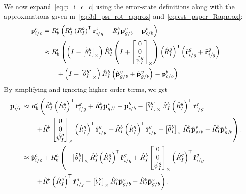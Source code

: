 We now expand~\eqref{eq:p_i_c_c} using the error-state definitions along with
the approximations given in~\eqref{eq:3d_psi_rot_approx}
and~\eqref{eq:est_paper_Rapprox}:
\begin{align}
  \mathrm{\mathbf{p}}_{i/c}^c &= R_b^c \left( R_I^b \left( R_I^g \right)^{\mathsf{T}}
  \mathrm{\mathbf{r}}_{i/g}^g + R_I^b \mathrm{\mathbf{p}}_{g/b}^v - \mathrm{\mathbf{p}}_{c/b}^b \right) \\
  &\approx R_b^c \left( \left( I - \left[ \tilde{\mathrm{\mathbf{\theta}}}_I^b
     \right]_{\times} \right) \hat{R}_I^b \left( I +
    \left[  \begin{matrix} 0 \\ 0 \\ \tilde{\psi}_I^g \end{matrix}  \right]_{\times}
  \right) \left( \hat{R}_I^g \right)^{\mathsf{T}}
  \left( \hat{\mathrm{\mathbf{r}}}_{i/g}^g + \tilde{\mathrm{\mathbf{r}}}_{i/g}^g \right) \right. \\
  & \qquad \left. + \left( I -
  \left[ \tilde{\mathrm{\mathbf{\theta}}}_I^b \right]_{\times} \right) \hat{R}_I^b
  \left( \hat{\mathrm{\mathbf{p}}}_{g/b}^v + \tilde{\mathrm{\mathbf{p}}}_{g/b}^v \right) -
  \mathrm{\mathbf{p}}_{c/b}^b \right). \nonumber \\
\end{align}
By simplifying and ignoring higher-order terms, we get
\begin{align}
  \mathrm{\mathbf{p}}_{i/c}^c 
  &\approx R_b^c \left( \hat{R}_I^b \left( \hat{R}_I^g \right)^{\mathsf{T}}
  \hat{\mathrm{\mathbf{r}}}_{i/g}^g + \hat{R}_I^b \hat{\mathrm{\mathbf{p}}}_{g/b}^v - \mathrm{\mathbf{p}}_{c/b}^b
  - \left[ \tilde{\mathrm{\mathbf{\theta}}}_I^b \right]_{\times} \hat{R}_I^b \left( \hat{R}_I^g
    \right)^{\mathsf{T}} \hat{\mathrm{\mathbf{r}}}_{i/g}^g \right. \\
  & \qquad \left. + \hat{R}_I^b
    \left[ \begin{matrix} 0 \\ 0 \\ \tilde{\psi}_I^g \end{matrix} \right]_{\times} \left( \hat{R}_I^g
  \right)^{\mathsf{T}} \hat{\mathrm{\mathbf{r}}}_{i/g}^g +
\hat{R}_I^b \left( \hat{R}_I^g
    \right)^{\mathsf{T}} \tilde{\mathrm{\mathbf{r}}}_{i/g}^g
    - \left[ \tilde{\mathrm{\mathbf{\theta}}}_I^b \right]_{\times} \hat{R}_I^b \hat{\mathrm{\mathbf{p}}}_{g/b}^v
    + \hat{R}_I^b \tilde{\mathrm{\mathbf{p}}}_{g/b}^v
   \right). \nonumber \\
    &\approx \hat{\mathrm{\mathbf{p}}}_{i/c}^c
    + R_b^c \left( 
  - \left[ \tilde{\mathrm{\mathbf{\theta}}}_I^b \right]_{\times} \hat{R}_I^b \left( \hat{R}_I^g
    \right)^{\mathsf{T}} \hat{\mathrm{\mathbf{r}}}_{i/g}^g + \hat{R}_I^b
    \left[ \begin{matrix} 0 \\ 0 \\ \tilde{\psi}_I^g \end{matrix} \right]_{\times} \left( \hat{R}_I^g
  \right)^{\mathsf{T}} \hat{\mathrm{\mathbf{r}}}_{i/g}^g \right. \label{eq:p_i_c_c_simplified} \\
    & \qquad \left. +
\hat{R}_I^b \left( \hat{R}_I^g
    \right)^{\mathsf{T}} \tilde{\mathrm{\mathbf{r}}}_{i/g}^g
                   - \left[ \tilde{\mathrm{\mathbf{\theta}}}_I^b \right]_{\times} \hat{R}_I^b \hat{\mathrm{\mathbf{p}}}_{g/b}^v
    + \hat{R}_I^b \tilde{\mathrm{\mathbf{p}}}_{g/b}^v
   \right) \nonumber. 
\end{align}
